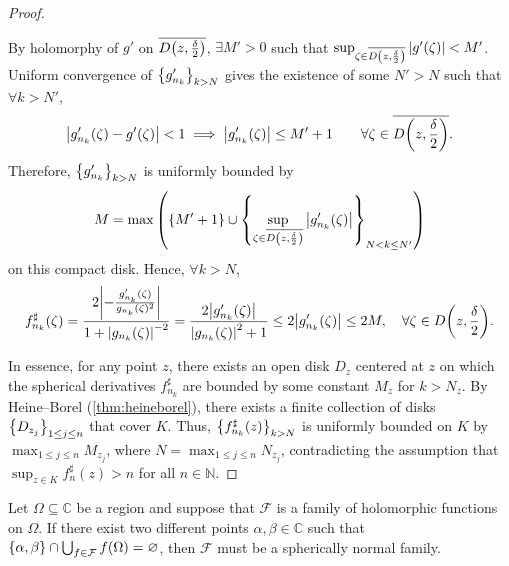 \begin{proof}
\begin{enumerate}
            By holomorphy of \(g'\) on \(\overline{D\qty(z,\frac\delta2)}\), \(\exists M'>0\) such that \(\sup_{\zeta\in\overline{D\qty(z,\frac\delta2)}}\abs{g'(\zeta)}<M'\). Uniform convergence of \(\cbraces{g'_{n_k}}_{k>N}\) gives the existence of some \(N'>N\) such that \(\forall k>N'\), \[\abs{g'_{n_k}(\zeta)-g'(\zeta)}<1\implies\abs{g'_{n_k}(\zeta)}\leq M'+1\qquad\forall\zeta\in\overline{D\qty(z,\frac\delta2)}.\] Therefore, \(\cbraces{g'_{n_k}}_{k>N}\) is uniformly bounded by \[M=\max\qty(\cbraces{M'+1}\cup\cbraces{\sup_{\zeta\in\overline{D\qty(z,\frac\delta2)}}\abs{g_{n_k}'(\zeta)}}_{N<k\leq N'})\] on this compact disk. Hence, \(\forall k>N\), \[f^\sharp_{n_k}(\zeta)=\frac{2\abs{-\frac{g_{n_k}'(\zeta)}{g_{n_k}(\zeta)^2}}}{1+\abs{g_{n_k}(\zeta)}^{-2}}=\frac{2\abs{g_{n_k}'(\zeta)}}{\abs{g_{n_k}(\zeta)}^2+1}\leq 2\abs{g'_{n_k}(\zeta)}\leq 2M,\quad\forall\zeta\in D\qty(z,\frac\delta2).\]
    \end{enumerate}
    In essence, for any point \(z\), there exists an open disk \(D_z\) centered at \(z\) on which the spherical derivatives \(f^\sharp_{n_k}\) are bounded by some constant \(M_z\) for \(k>N_z\). By Heine--Borel (\cref{thm:heineborel}), there exists a finite collection of disks \(\cbraces{D_{z_j}}_{1\leq j\leq n}\) that cover \(K\). Thus, \(\cbraces{f_{n_k}^\sharp(z)}_{k>N}\) is uniformly bounded on \(K\) by \(\max_{1\leq j\leq n}M_{z_j}\), where \(N=\max_{1\leq j\leq n} N_{z_j}\), contradicting the assumption that \(\sup_{z\in K}f^\sharp_n(z)>n\) for all \(n\in\mathbb{N}\).
\end{proof}
\begin{theorem}\label{thm:fundamentalnormalitytest}
    Let \(\Omega\subseteq\mathbb{C}\) be a region and suppose that \(\mathcal{F}\) is a family of holomorphic functions on \(\Omega\). If there exist two different points \(\alpha,\beta\in\mathbb{C}\) such that \(\cbraces{\alpha,\beta}\cap\bigcup_{f\in\mathcal{F}}f(\Omega)=\varnothing\), then \(\mathcal{F}\) must be a spherically normal family.
\end{theorem}
